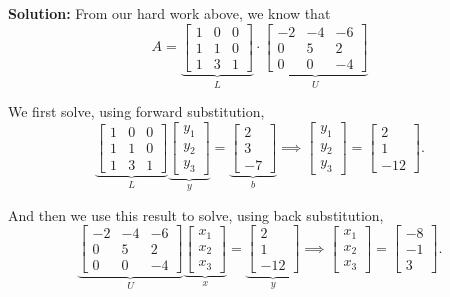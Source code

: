 \textbf{Solution:} From our hard work above, we know that 
\begin{equation}
    \label{eq:Chap5pt4LU}
    A= \underbrace{\left[\begin{array}{rrr} 1 & 0 & 0\\ 1 & 1 & 0\\ 1 & 3 & 1\end{array} \right]}_{L} \cdot  \underbrace{\left[\begin{array}{rrr} -2 & -4 & -6 \\ 0 & 5 &  2 \\ 0 &  0 & -4\end{array} \right]}_{U} 
    \end{equation}

We first solve, using forward substitution, 
$$\underbrace{\left[\begin{array}{rrr} 1 & 0 & 0\\ 1 & 1 & 0\\ 1 & 3 & 1\end{array} \right]}_{L} \underbrace{\begin{bmatrix}y_1 \\y_2 \\ y_3 \end{bmatrix}}_{y} =\underbrace{\left[\begin{array}{r} 2\\
3 \\ -7 \end{array}\right]}_{b} \implies\begin{bmatrix}y_1 \\y_2 \\ y_3 \end{bmatrix} = \left[\begin{array}{r} 2\\
1 \\ -12\end{array}\right]. $$

And then we use this result to solve, using back substitution,
$$ \underbrace{\left[\begin{array}{rrr} -2 & -4 & -6 \\ 0 & 5 &  2 \\ 0 &  0 & -4\end{array} \right]}_{U} \underbrace{\begin{bmatrix}x_1 \\x_2 \\ x_3 \end{bmatrix}}_{x} =\underbrace{\left[\begin{array}{r} 2\\
1\\ -12 \end{array}\right]}_{y} \implies\begin{bmatrix}x_1 \\x_2 \\ x_3 \end{bmatrix} = \left[\begin{array}{r} -8\\
-1 \\ 3\end{array}\right]. $$
\Qed

